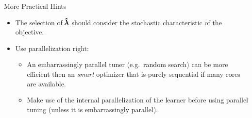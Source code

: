 \begin{frame}[allowframebreaks]{More Practical Hints}
\begin{itemize}
  \item The selection of $\pmb{\hat{\lambda}}$ should consider the stochastic characteristic of the objective.

  \item Use parallelization right:
  \begin{itemize}
    \item An embarrassingly parallel tuner (e.g.\ random search) can be more efficient then an \emph{smart} optimizer that is purely sequential if many cores are available.
    \item Make use of the internal parallelization of the learner before using parallel tuning (unless it is embarrassingly parallel).
  \end{itemize}

\end{itemize}
\end{frame}


